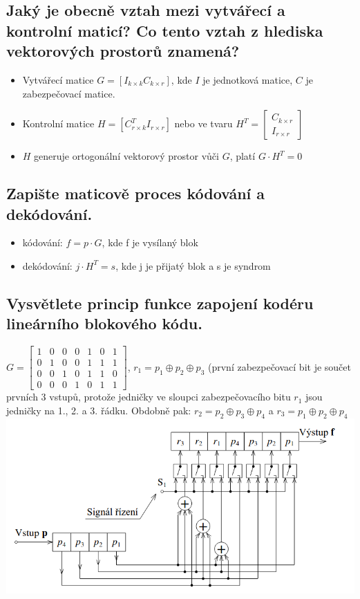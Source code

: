 \subsection{Jaký je obecně vztah mezi vytvářecí a kontrolní maticí? Co tento vztah z hlediska
vektorových prostorů znamená?}
\begin{itemize}
    \item Vytvářecí matice $G=[I_{k\times k} C_{k\times r}]$, kde $I$ je jednotková matice, $C$ je zabezpečovací matice.
    \item Kontrolní matice $H=[C^T_{r\times k} I_{r\times r}]$ nebo ve tvaru $H^T=\left[ \begin{array}{cc}
        C_{k\times r} \\
        I_{r\times r}
    \end{array}\right]$
    \item $H$ generuje ortogonální vektorový prostor vůči $G$, platí $G\cdot H^T=0$
\end{itemize}

\subsection{Zapište maticově proces kódování a dekódování.}
\begin{itemize}
    \item kódování: $f=p\cdot G$, kde f je vysílaný blok
    \item dekódování: $j\cdot H^T=s$, kde j je přijatý blok a s je syndrom
\end{itemize}

\subsection{Vysvětlete princip funkce zapojení kodéru lineárního blokového kódu.}
$G=\left[\begin{array}{ccccccc}
    1 & 0 & 0 & 0 & 1 & 0 & 1 \\
    0 & 1 & 0 & 0 & 1 & 1 & 1 \\
    0 & 0 & 1 & 0 & 1 & 1 & 0 \\
    0 & 0 & 0 & 1 & 0 & 1 & 1
\end{array} \right]$, $r_1=p_1 \oplus p_2 \oplus p_3$ (první zabezpečovací bit je součet prvních 3 vstupů,
protože jedničky ve sloupci zabezpečovacího bitu $r_1$ jsou jedničky na 1., 2. a 3. řádku. Obdobně pak:
$r_2=p_2\oplus p_3 \oplus p_4$ a $r_3=p_1 \oplus p_2 \oplus p_4$\\
\includegraphics[width=16cm]{images/6_koder.png}


